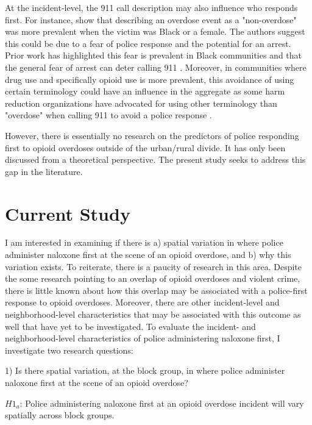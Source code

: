 At the incident-level, the 911 call description may also influence who responds first. For instance, \textcite{atkins_disparities_2024} show that describing an overdose event as a "non-overdose" was more prevalent when the victim was Black or a female. The authors suggest this could be due to a fear of police response and the potential for an arrest. Prior work has highlighted this fear is prevalent in Black communities \parencite{wagner_post-overdose_2019} and that the general fear of arrest can deter calling 911 \parencite{van_der_meulen_thats_2021}. Moreover, in communities where drug use and specifically opioid use is more prevalent, this avoidance of using certain terminology could have an influence in the aggregate as some harm reduction organizations have advocated for using other terminology than "overdose" when calling 911 to avoid a police response \parencite{zagorski_how_2021}.

However, there is essentially no research on the predictors of police responding first to opioid overdoses outside of the urban/rural divide. It has only been discussed from a theoretical perspective. The present study seeks to address this gap in the literature. 

\section{Current Study}

I am interested in examining if there is a) spatial variation in where police administer naloxone first at the scene of an opioid overdose, and b) why this variation exists. To reiterate, there is a paucity of research in this area. Despite the some research pointing to an overlap of opioid overdoses and violent crime, there is little known about how this overlap may be associated with a police-first response to opioid overdoses. Moreover, there are other incident-level and neighborhood-level characteristics that may be associated with this outcome as well that have yet to be investigated. To evaluate the incident- and neighborhood-level characteristics of police administering naloxone first, I investigate two research questions:

1) Is there spatial variation, at the block group, in where police administer naloxone first at the scene of an opioid overdose? 

\begin{flushleft}
\(H1_a\): Police administering naloxone first at an opioid overdose incident will vary spatially across block groups. 
\end{flushleft}

